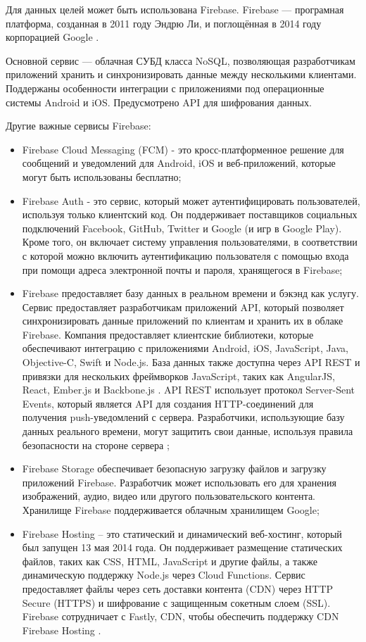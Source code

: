 Для данных целей может быть использована Firebase. Firebase — програмная платформа, созданная в 2011 году Эндрю Ли, и поглощённая в 2014 году корпорацией Google \cite{firebase_doc}.

Основной сервис — облачная СУБД класса NoSQL, позволяющая разработчикам приложений хранить и синхронизировать данные между несколькими клиентами. Поддержаны особенности интеграции с приложениями под операционные системы Android и iOS. \newline Предусмотрено API для шифрования данных.

Другие важные сервисы Firebase:

\begin{itemize}
	\item Firebase Cloud Messaging (FCM) - это кросс-платформенное решение для сообщений и уведомлений для Android, iOS и веб-приложений, которые могут быть использованы бесплатно;
	\item Firebase Auth - это сервис, который может аутентифицировать пользователей, используя только клиентский код. Он поддерживает поставщиков социальных подключений Facebook, GitHub, Twitter и Google (и игр в Google Play). Кроме того, он включает систему управления пользователями, в соответствии с которой можно включить аутентификацию пользователя с помощью входа при помощи адреса электронной почты и пароля, хранящегося в Firebase;
	\item Firebase предоставляет базу данных в реальном времени и бэкэнд как услугу. Сервис предоставляет разработчикам приложений API, который позволяет синхронизировать данные приложений по клиентам и хранить их в облаке Firebase. Компания предоставляет клиентские библиотеки, которые обеспечивают интеграцию с приложениями Android, iOS, JavaScript, Java, Objective-C, Swift и Node.js. База данных также доступна через API REST и привязки для нескольких фреймворков JavaScript, таких как AngularJS, React, Ember.js и Backbone.js \cite{react}. API REST использует протокол Server-Sent Events, который является API для создания HTTP-соединений для получения push-уведомлений с сервера. Разработчики, использующие базу данных реального времени, могут защитить свои данные, используя правила безопасности на стороне сервера \cite{firebase_database};
	\item Firebase Storage обеспечивает безопасную загрузку файлов и загрузку приложений Firebase. Разработчик может использовать его для хранения изображений, аудио, видео или другого пользовательского контента. Хранилище Firebase поддерживается облачным хранилищем Google;
	\item Firebase Hosting – это статический и динамический веб-хостинг, который был запущен 13 мая 2014 года. Он поддерживает размещение статических файлов, таких как CSS, HTML, JavaScript и другие файлы, а также динамическую поддержку Node.js через Cloud Functions. Сервис предоставляет файлы через сеть доставки контента (CDN) через HTTP Secure (HTTPS) и шифрование с защищенным сокетным слоем (SSL). Firebase сотрудничает с Fastly, CDN, чтобы обеспечить поддержку CDN Firebase Hosting \cite{firebase_hosting}.
\end{itemize}


